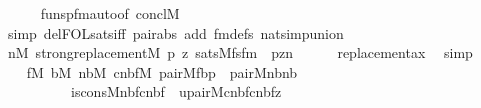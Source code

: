 \begin{isabellebody}
\ \ \ \ \isamarkupfalse%
\ funsp{\isacharunderscore}{\kern0pt}fm{\isacharunderscore}{\kern0pt}auto{\isacharbrackleft}{\kern0pt}of\ concl{\isacharcolon}{\kern0pt}M{\isacharbrackright}{\kern0pt}\ \isamarkupfalse%
\ {\isacharparenleft}{\kern0pt}simp\ del{\isacharcolon}{\kern0pt}FOL{\isacharunderscore}{\kern0pt}sats{\isacharunderscore}{\kern0pt}iff\ pair{\isacharunderscore}{\kern0pt}abs\ add{\isacharcolon}{\kern0pt}\ fm{\isacharunderscore}{\kern0pt}defs\ nat{\isacharunderscore}{\kern0pt}simp{\isacharunderscore}{\kern0pt}union{\isacharparenright}{\kern0pt}\isanewline
\ \ \isamarkupfalse%
\isanewline
\ \ \isamarkupfalse%
\ {\isachardoublequoteopen}{\isasymforall}n{}{\isasymin}M{\isachardot}{\kern0pt}\ strong{\isacharunderscore}{\kern0pt}replacement{\isacharparenleft}{\kern0pt}{\isacharhash}{\kern0pt}{\isacharhash}{\kern0pt}M{\isacharcomma}{\kern0pt}\ {\isasymlambda}p\ z{\isachardot}{\kern0pt}\ sats{\isacharparenleft}{\kern0pt}M{\isacharcomma}{\kern0pt}fsfm{\isacharparenleft}{\kern0pt}{}{\isacharcomma}{\kern0pt}{}{\isacharcomma}{\kern0pt}{}{\isacharparenright}{\kern0pt}\ {\isacharcomma}{\kern0pt}\ {\isacharbrackleft}{\kern0pt}p{\isacharcomma}{\kern0pt}z{\isacharcomma}{\kern0pt}n{}{\isacharbrackright}{\kern0pt}{\isacharparenright}{\kern0pt}{\isacharparenright}{\kern0pt}{\isachardoublequoteclose}\isanewline
\ \ \ \ \isamarkupfalse%
\ replacement{\isacharunderscore}{\kern0pt}ax\ \isamarkupfalse%
\ simp\isanewline
\ \ \isamarkupfalse%
\isanewline
\ \ \isamarkupfalse%
\ {\isachardoublequoteopen}{\isacharparenleft}{\kern0pt}{\isasymexists}f{\isasymin}M{\isachardot}{\kern0pt}\ {\isasymexists}b{\isasymin}M{\isachardot}{\kern0pt}\ {\isasymexists}nb{\isasymin}M{\isachardot}{\kern0pt}\ {\isasymexists}cnbf{\isasymin}M{\isachardot}{\kern0pt}\ pair{\isacharparenleft}{\kern0pt}{\isacharhash}{\kern0pt}{\isacharhash}{\kern0pt}M{\isacharcomma}{\kern0pt}f{\isacharcomma}{\kern0pt}b{\isacharcomma}{\kern0pt}p{\isacharparenright}{\kern0pt}\ {\isacharampersand}{\kern0pt}\ pair{\isacharparenleft}{\kern0pt}{\isacharhash}{\kern0pt}{\isacharhash}{\kern0pt}M{\isacharcomma}{\kern0pt}n{}{\isacharcomma}{\kern0pt}b{\isacharcomma}{\kern0pt}nb{\isacharparenright}{\kern0pt}\ {\isacharampersand}{\kern0pt}\isanewline
\ \ \ \ \ \ \ \ \ \ is{\isacharunderscore}{\kern0pt}cons{\isacharparenleft}{\kern0pt}{\isacharhash}{\kern0pt}{\isacharhash}{\kern0pt}M{\isacharcomma}{\kern0pt}nb{\isacharcomma}{\kern0pt}f{\isacharcomma}{\kern0pt}cnbf{\isacharparenright}{\kern0pt}\ {\isacharampersand}{\kern0pt}\ upair{\isacharparenleft}{\kern0pt}{\isacharhash}{\kern0pt}{\isacharhash}{\kern0pt}M{\isacharcomma}{\kern0pt}cnbf{\isacharcomma}{\kern0pt}cnbf{\isacharcomma}{\kern0pt}z{\isacharparenright}{\kern0pt}{\isacharparenright}{\kern0pt}\isanewline

\end{isabellebody}
